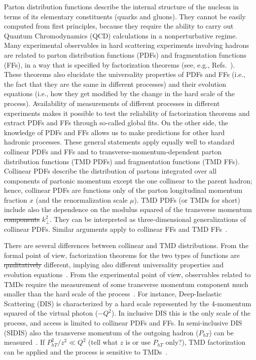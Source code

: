 \documentclass[aps,preprintnumbers,showpacs,nofootinbib,superscriptaddress,floatfix]{revtex4}
\newcommand{\AS}[1]{{\textcolor[rgb]{1,0,1}{#1}}}
\newcommand{\T}{\perp}
\begin{document}
Parton distribution functions describe the internal structure of the nucleon
in terms of its elementary constituents (quarks and gluons). They cannot be
easily computed from first principles, because they require the ability to
carry out Quantum Chromodynamics (QCD) calculations in a nonperturbative
regime. Many experimental observables in hard scattering experiments
involving hadrons are related to parton distribution functions (PDFs) and
fragmentation functions (FFs), in a way that is specified by factorization
theorems (see, e.g., Refs.~\cite{Collins:1989gx,Collins:2011zzd}). 
These theorems also elucidate the universality properties of PDFs and FFs
(i.e., the fact that they are the same in different processes) 
and their evolution equations (i.e., how they get modified by the change in
the hard scale of the process). 
Availability of measurements of different processes in different
experiments makes it possible to test the reliability of factorization
theorems and extract PDFs and FFs through so-called global fits. 
On the other side, the knowledge of PDFs and FFs allows us
to make predictions for other hard hadronic processes. 
These general statements apply equally well to
standard collinear PDFs and FFs and to transverse-momentum-dependent parton
distribution functions (TMD PDFs) and fragmentation functions (TMD FFs). 
Collinear PDFs
describe the distribution of partons integrated over all components of
partonic momentum except the one collinear to the parent hadron; hence,
collinear PDFs
are functions only of the parton longitudinal momentum fraction $x$ \AS{(and the renormalization scale $\mu$)}. 
TMD PDFs (or TMDs for short) 
include also the dependence on \AS{the modulus squared of the} transverse momentum \AS{\sout{components}} $k_{\T}^2$. 
They can be interpreted as three-dimensional generalizations of collinear PDFs.
Similar arguments apply to collinear FFs and TMD FFs~\cite{Angeles-Martinez:2015sea}.

There are several differences between collinear and TMD distributions. From
the formal point of view, factorization theorems for the two types of
functions are \AS{\sout{qualitatively}} different, implying also different universality
properties and evolution equations~\cite{Rogers:2015sqa}. From the
experimental point 
of view, observables related to TMDs require the measurement of some transverse
momentum component much smaller than the hard scale of the
process~\cite{Bacchetta:2016ccz,Radici:2016hbh}.  For
instance, Deep-Inelastic Scattering (DIS) is characterized by a hard scale represented by the
4-momentum squared of the virtual photon ($-Q^2$). In inclusive DIS this is
the only scale of the process, and access is limited to collinear PDFs
and FFs. In semi-inclusive DIS (SIDIS) also the transverse momentum of the
outgoing  
hadron ($P_{hT}$) can be measured~\cite{Mulders:1995dh,Bacchetta:2006tn}. 
If \AS{$P_{hT}^2/z^2 \ll Q^2$} \AS{(tell what $z$ is or use $P_{hT}$ only?)}, TMD
factorization can be applied and the process is sensitive to
TMDs~\cite{Collins:2011zzd}. 
\end{document}
